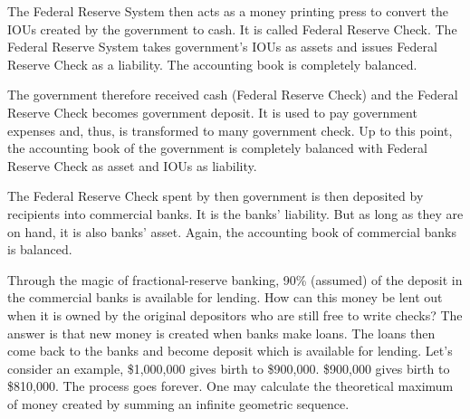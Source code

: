 \documentclass[a4paper]{report}
\begin{document}
The Federal Reserve System then acts as a money printing press to convert the IOUs created by the government to cash. It is called Federal Reserve Check. The Federal Reserve System takes government's IOUs as assets and issues Federal Reserve Check as a liability. The accounting book is completely balanced.

The government therefore received cash (Federal Reserve Check) and the Federal Reserve Check becomes government deposit. It is used to pay government expenses and, thus, is transformed to many government check. Up to this point, the accounting book of the government is completely balanced with Federal Reserve Check as asset and IOUs as liability.

The Federal Reserve Check spent by then government is then deposited by recipients into commercial banks. It is the banks' liability. But as long as they are on hand, it is also banks' asset. Again, the accounting book of commercial banks is balanced.

Through the magic of fractional-reserve banking, 90\% (assumed) of the deposit in the commercial banks is available for lending. How can this money be lent out when it is owned by the original depositors who are still free to write checks? The answer is that new money is created when banks make loans. The loans then come back to the banks and become deposit which is available for lending. Let's consider an example, \$1,000,000 gives birth to \$900,000. \$900,000 gives birth to \$810,000. The process goes forever. One may calculate the theoretical maximum of money created by summing an infinite geometric sequence.
\end{document}
